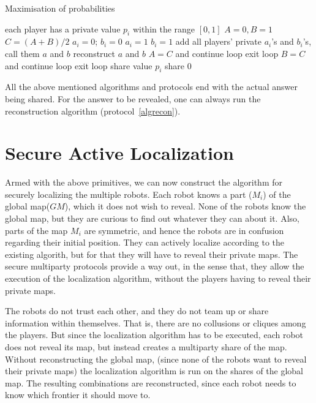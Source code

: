 \begin{algorithm}
\caption{Maximisation of probabilities}
\label{algmax}
\begin{algorithmic}
\REQUIRE each player has a private value $p_{i}$ within the range $[0,1]$
\STATE $A = 0, B = 1$
\LOOP
\STATE $C = (A + B) / 2$
	\STATE $a_{i} = 0 $; $b_{i} = 0$
		\STATE $a_{i} = 1 $
	\ELSE
		\STATE $ b_{i} = 1$
	\ENDIF
	\STATE {}
	\STATE add all players' private $a_{i}$'s and $b_{i}$'s, call them $a$ and $b$
	\STATE reconstruct $a$ and $b$
		\STATE $A = C$ and continue loop
		\STATE exit loop 
		\STATE $B = C$ and continue loop
	\ELSE
		\STATE exit loop 
	\ENDIF
\ENDFOR
\ENDLOOP
\STATE {}
		\STATE share value $p_{i}$
	\ELSE
		\STATE share $0$
	\ENDIF
\ENDFOR
\end{algorithmic}
\end{algorithm}



All the above mentioned algorithms and protocols end with the actual answer being shared. 
For the answer to be revealed, one can always run the reconstruction algorithm (protocol~\ref{algrecon}).

\section{Secure Active Localization}
\label{sec:secloc}

Armed with the above primitives, we can now construct the algorithm for securely localizing the multiple robots.
Each robot knows a part ($M_{i}$) of the global map($GM$), which it does not wish to reveal. None of the robots know
the global map, but they are curious to find out whatever they can about it. Also, parts of the map $M_{i}$ are 
symmetric, and hence the robots are in confusion regarding their initial position. They can actively localize according 
to the existing algorith, but for that they will have to reveal their private maps. The secure multiparty protocols
provide a way out, in the sense that, they allow the execution of the localization algorithm, without the players 
having to reveal their private maps.

The robots do not trust each other, and they do not team up or share information within themselves. That is, there are
no collusions or cliques among the players. But since the localization algorithm has to be executed, 
each robot does not reveal its map, but instead creates a multiparty share of the map. Without reconstructing the global 
map, (since none of the robots want to reveal their private maps) the localization algorithm is run on the shares of the 
global map. The resulting combinations are reconstructed, since each robot needs to know which frontier it should move to. 

